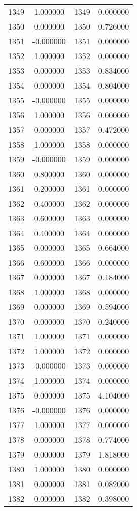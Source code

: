 \documentclass[12pt]{article}
\begin{document}
\begin{longtable}{@{}cccc@{}}
1349 & 1.000000 & 1349 & 0.000000 \\
1350 & 0.000000 & 1350 & 0.726000 \\
1351 & -0.000000 & 1351 & 0.000000 \\
1352 & 1.000000 & 1352 & 0.000000 \\
1353 & 0.000000 & 1353 & 0.834000 \\
1354 & 0.000000 & 1354 & 0.804000 \\
1355 & -0.000000 & 1355 & 0.000000 \\
1356 & 1.000000 & 1356 & 0.000000 \\
1357 & 0.000000 & 1357 & 0.472000 \\
1358 & 1.000000 & 1358 & 0.000000 \\
1359 & -0.000000 & 1359 & 0.000000 \\
1360 & 0.800000 & 1360 & 0.000000 \\
1361 & 0.200000 & 1361 & 0.000000 \\
1362 & 0.400000 & 1362 & 0.000000 \\
1363 & 0.600000 & 1363 & 0.000000 \\
1364 & 0.400000 & 1364 & 0.000000 \\
1365 & 0.000000 & 1365 & 0.664000 \\
1366 & 0.600000 & 1366 & 0.000000 \\
1367 & 0.000000 & 1367 & 0.184000 \\
1368 & 1.000000 & 1368 & 0.000000 \\
1369 & 0.000000 & 1369 & 0.594000 \\
1370 & 0.000000 & 1370 & 0.240000 \\
1371 & 1.000000 & 1371 & 0.000000 \\
1372 & 1.000000 & 1372 & 0.000000 \\
1373 & -0.000000 & 1373 & 0.000000 \\
1374 & 1.000000 & 1374 & 0.000000 \\
1375 & 0.000000 & 1375 & 4.104000 \\
1376 & -0.000000 & 1376 & 0.000000 \\
1377 & 1.000000 & 1377 & 0.000000 \\
1378 & 0.000000 & 1378 & 0.774000 \\
1379 & 0.000000 & 1379 & 1.818000 \\
1380 & 1.000000 & 1380 & 0.000000 \\
1381 & 0.000000 & 1381 & 0.082000 \\
1382 & 0.000000 & 1382 & 0.398000 \\

\end{longtable}
\end{document}
